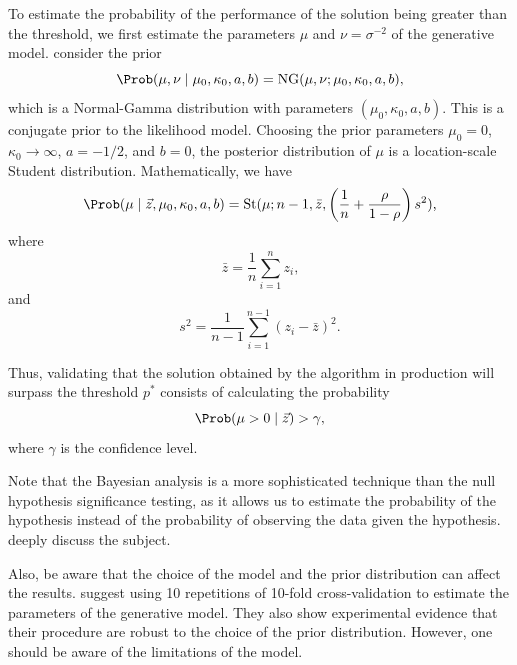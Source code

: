 To estimate the probability of the performance of the solution being greater than the
threshold, we first estimate the parameters $\mu$ and $\nu = \sigma^{-2}$ of the
generative model.  \citeauthor{Benavoli2017} consider the prior
\begin{equation*}
  \Prob(\mu, \nu \mid \mu_0, \kappa_0, a, b) = \operatorname{NG}(\mu, \nu; \mu_0, \kappa_0, a, b)\text{,}
\end{equation*}
which is a Normal-Gamma distribution with parameters $(\mu_0, \kappa_0, a, b)$.  This is a
conjugate prior to the likelihood model.  Choosing the prior parameters $\mu_0 = 0$,
$\kappa_0 \to \infty$, $a = -1/2$, and $b = 0$, the posterior distribution of $\mu$ is a
location-scale Student distribution.  Mathematically, we have
\begin{equation*}
  \Prob(\mu \mid \vec{z}, \mu_0, \kappa_0, a, b) =
    \operatorname{St}(\mu; n - 1, \bar{z}, \left(
      \frac{1}{n} + \frac{\rho}{1 - \rho}
    \right)s^2)\text{,}
\end{equation*}
where
\begin{equation*}
  \bar{z} = \frac{1}{n} \sum_{i=1}^n z_i\text{,}
\end{equation*}
and
\begin{equation*}
  s^2 = \frac{1}{n - 1} \sum_{i=1}^{n-1} (z_i - \bar{z})^2\text{.}
\end{equation*}

Thus, validating that the solution obtained by the algorithm in production will surpass
the threshold $p^{*}$ consists of calculating the probability
\begin{equation*}
  \Prob(\mu > 0 \mid \vec{z}) > \gamma\text{,}
\end{equation*}
where $\gamma$ is the confidence level.

Note that the Bayesian analysis is a more sophisticated technique than the null hypothesis
significance testing, as it allows us to estimate the probability of the hypothesis
instead of the probability of observing the data given the hypothesis.
\textcite{Benavoli2017} deeply discuss the subject.

Also, be aware that the choice of the model and the prior distribution can affect the
results.  \citeauthor{Benavoli2017} suggest using 10 repetitions of 10-fold cross-validation
to estimate the parameters of the generative model.  They also show experimental evidence
that their procedure are robust to the choice of the prior distribution.  However, one
should be aware of the limitations of the model.

